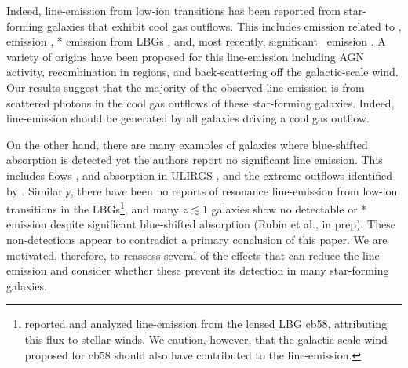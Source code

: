 \documentclass[]{emulateapj}
\begin{document}
Indeed, line-emission from low-ion transitions has been reported from 
star-forming galaxies that exhibit cool gas outflows.  
This includes emission related to  \citep{phillips93,cth+10},
 emission \citep{wcp+09,rwk+10}, 
* emission from LBGs \citep{shapley03},
and, most recently, significant \feiis\ emission \citep{rubin+10c}. 
A variety of origins have been proposed for this
line-emission including AGN activity, recombination in 
regions, and back-scattering off the galactic-scale wind.
Our results suggest that the majority of the observed line-emission is 
from scattered photons in the cool gas outflows of these star-forming
galaxies.  Indeed, line-emission should be generated by all 
galaxies driving a cool gas outflow.

On the other hand,
there are many examples of galaxies where blue-shifted absorption is
detected yet the authors report no significant line emission.  This
includes  flows \citep{rvs05a,martin05,smn+09}, 
 and  absorption in
ULIRGS \citep{mb09}, and the extreme  outflows identified
by \cite{tmd07}.  Similarly, there have been no reports of
resonance line-emission from low-ion transitions in the
LBGs\footnote{\citet{psa+00}
  reported and analyzed  line-emission from the lensed LBG
  cb58, attributing this flux to stellar winds.  We caution, however,
  that the galactic-scale wind proposed for cb58 should also
  have contributed to the  line-emission.}, and many
$z \lesssim 1$ galaxies show no detectable  or *
emission despite significant blue-shifted absorption (Rubin et al., in prep). 
These non-detections appear to contradict a primary conclusion of 
this paper.   We are motivated, therefore, to
reassess several of the effects that can reduce the line-emission
and consider whether these prevent its detection in many
star-forming galaxies.  
\end{document}
